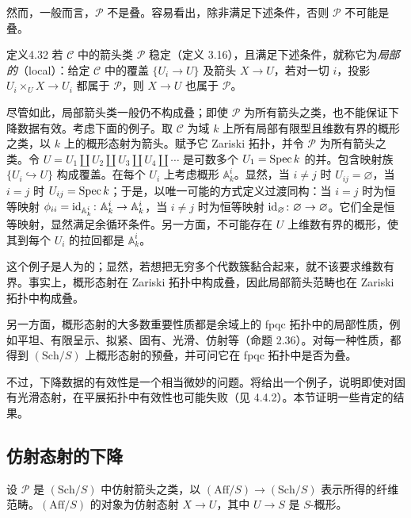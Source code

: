然而，一般而言，$\mathcal P$ 不是叠。容易看出，除非满足下述条件，否则 $\mathcal P$ 不可能是叠。

\begin{origstatement}{定义}{4.32}\label{ch04:def432}
若 $\mathcal C$ 中的箭头类 $\mathcal P$ 稳定（定义 3.16），且满足下述条件，就称它为\emph{局部的}（local）：给定 $\mathcal C$ 中的覆盖 $\{U_i\to U\}$ 及箭头 $X\to U$，若对一切 $i$，投影 $U_i\times_U X\to U_i$ 都属于 $\mathcal P$，则 $X\to U$ 也属于 $\mathcal P$。
\end{origstatement}

尽管如此，局部箭头类一般仍不构成叠；即使 $\mathcal P$ 为所有箭头之类，也不能保证下降数据有效。考虑下面的例子。取 $\mathcal C$ 为域 $k$ 上所有局部有限型且维数有界的概形之类，以 $k$ 上的概形态射为箭头。赋予它 Zariski 拓扑，并令 $\mathcal P$ 为所有箭头之类。令 $U=U_1\coprod U_2\coprod U_3\coprod U_4\coprod\cdots$ 是可数多个 $U_1=\operatorname{Spec} k$ 的并。包含映射族 $\{U_i\hookrightarrow U\}$ 构成覆盖。在每个 $U_i$ 上考虑概形 $\mathbb A_k^i$。显然，当 $i\ne j$ 时 $U_{ij}=\varnothing$，当 $i=j$ 时 $U_{ij}=\operatorname{Spec} k$；于是，以唯一可能的方式定义过渡同构：当 $i=j$ 时为恒等映射 $\phi_{ii}=\mathrm{id}_{\mathbb A_k^i}\colon\mathbb A_k^i\to\mathbb A_k^i$，当 $i\ne j$ 时为恒等映射 $\mathrm{id}_{\varnothing}\colon\varnothing\to\varnothing$。它们全是恒等映射，显然满足余循环条件。另一方面，不可能存在 $U$ 上维数有界的概形，使其到每个 $U_i$ 的拉回都是 $\mathbb A_k^i$。

这个例子是人为的；显然，若想把无穷多个代数簇黏合起来，就不该要求维数有界。事实上，概形态射在 Zariski 拓扑中构成叠，因此局部箭头范畴也在 Zariski 拓扑中构成叠。

另一方面，概形态射的大多数重要性质都是余域上的 fpqc 拓扑中的局部性质，例如平坦、有限呈示、拟紧、固有、光滑、仿射等（命题 2.36）。对每一种性质，都得到 $(\mathrm{Sch}/S)$ 上概形态射的预叠，并可问它在 fpqc 拓扑中是否为叠。

不过，下降数据的有效性是一个相当微妙的问题。将给出一个例子，说明即使对固有光滑态射，在平展拓扑中有效性也可能失败（见 4.4.2）。本节证明一些肯定的结果。

\subsection{仿射态射的下降}
设 $\mathcal P$ 是 $(\mathrm{Sch}/S)$ 中仿射箭头之类，以 $(\mathrm{Aff}/S)\to(\mathrm{Sch}/S)$ 表示所得的纤维范畴。$(\mathrm{Aff}/S)$ 的对象为仿射态射 $X\to U$，其中 $U\to S$ 是 $S$-概形。


